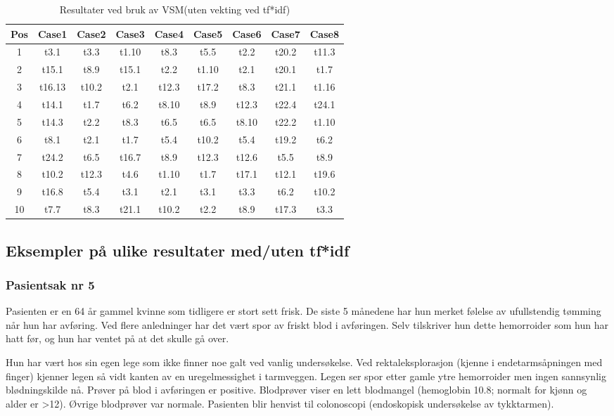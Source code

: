 \begin{table}[h!]
\begin{center}
\begin{tabular}{ | c c c c c c c c c | }
\hline
\textbf{Pos} & \textbf{Case1} & \textbf{Case2} & \textbf{Case3} & \textbf{Case4} & \textbf{Case5} & \textbf{Case6} & \textbf{Case7} & \textbf{Case8} \\ \hline
1 & t3.1 & t3.3 & t1.10 & t8.3 & t5.5 & t2.2 & t20.2 & t11.3 \\
2 & t15.1 & t8.9 & t15.1 & t2.2 & t1.10 & t2.1 & t20.1 & t1.7 \\
3 & t16.13 & t10.2 & t2.1 & t12.3 & t17.2 & t8.3 & t21.1 & t1.16 \\
4 & t14.1 & t1.7 & t6.2 & t8.10 & t8.9 & t12.3 & t22.4 & t24.1 \\
5 & t14.3 & t2.2 & t8.3 & t6.5 & t6.5 & t8.10 & t22.2 & t1.10 \\
6 & t8.1 & t2.1 & t1.7 & t5.4 & t10.2 & t5.4 & t19.2 & t6.2 \\
7 & t24.2 & t6.5 & t16.7 & t8.9 & t12.3 & t12.6 & t5.5 & t8.9 \\
8 & t10.2 & t12.3 & t4.6 & t1.10 & t1.7 & t17.1 & t12.1 & t19.6 \\
9 & t16.8 & t5.4 & t3.1 & t2.1 & t3.1 & t3.3 & t6.2 & t10.2 \\
10 & t7.7 & t8.3 & t21.1 & t10.2 & t2.2 & t8.9 & t17.3 & t3.3 \\
\hline
\end{tabular}
\end{center}
\caption{Resultater ved bruk av VSM(uten vekting ved tf*idf)}
\end{table}

\pagebreak
\subsection{Eksempler på ulike resultater med/uten tf*idf}
\subsubsection{Pasientsak nr 5}
Pasienten er en 64 år gammel kvinne som tidligere er stort sett frisk. De siste 5 månedene har hun merket følelse av ufullstendig tømming når hun har avføring. Ved flere anledninger har det vært spor av friskt blod i avføringen. Selv tilskriver hun dette hemorroider som hun har hatt før, og hun har ventet på at det skulle gå over.

Hun har vært hos sin egen lege som ikke finner noe galt ved vanlig undersøkelse. Ved rektaleksplorasjon (kjenne i endetarmsåpningen med finger) kjenner legen så vidt kanten av en uregelmessighet i tarmveggen. Legen ser spor etter gamle ytre hemorroider men ingen sannsynlig blødningskilde nå. Prøver på blod i avføringen er positive. Blodprøver viser en lett blodmangel (hemoglobin 10.8; normalt for kjønn og alder er >12). Øvrige blodprøver var normale. Pasienten blir henvist til colonoscopi (endoskopisk undersøkelse av tykktarmen).

